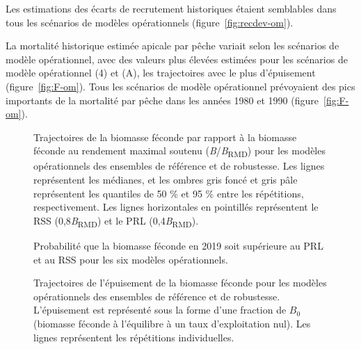\documentclass[11pt]{book}
\begin{document}
Les estimations des écarts de recrutement historiques étaient semblables dans tous les scénarios de modèles opérationnels (figure~\ref{fig:recdev-om}).

La mortalité historique estimée apicale par pêche variait selon les scénarios de modèle opérationnel, avec des valeurs plus élevées estimées pour les scénarios de modèle opérationnel (4) et (A), les trajectoires avec le plus d'épuisement (figure~\ref{fig:F-om}). Tous les scénarios de modèle opérationnel prévoyaient des pics importants de la mortalité par pêche dans les années 1980 et 1990 (figure~\ref{fig:F-om}).


\begin{figure}[htb]

{\centering {} 

}

\caption{Trajectoires de la biomasse féconde par rapport à la biomasse féconde au rendement maximal soutenu (\emph{B}/\emph{B}\textsubscript{RMD}) pour les modèles opérationnels des ensembles de référence et de robustesse. Les lignes représentent les médianes, et les ombres gris foncé et gris pâle représentent les quantiles de 50 \% et 95 \% entre les répétitions, respectivement. Les lignes horizontales en pointillés représentent le RSS (0,8\emph{B}\textsubscript{RMD}) et le PRL (0,4\emph{B}\textsubscript{RMD}).}\label{fig:biomass-om}
\end{figure}

\begin{figure}[htb]

{\centering {} 

}

\caption{Probabilité que la biomasse féconde en 2019 soit supérieure au PRL et au RSS pour les six modèles opérationnels.}\label{fig:ref-pt}
\end{figure}

\begin{figure}[htb]

{\centering {} 

}

\caption{Trajectoires de l'épuisement de la biomasse féconde pour les modèles opérationnels des ensembles de référence et de robustesse. L'épuisement est représenté sous la forme d'une fraction de \(B_0\) (biomasse féconde à l'équilibre à un taux d'exploitation nul). Les lignes représentent les répétitions individuelles.}\label{fig:depletion-om}
\end{figure}
\end{document}
